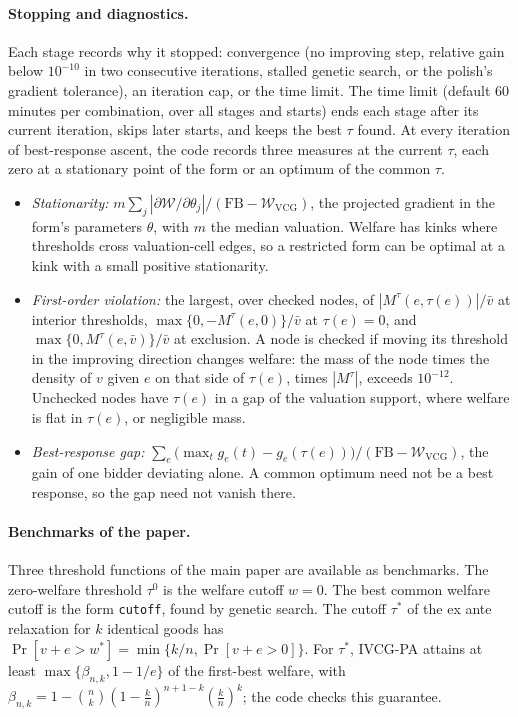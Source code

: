 \documentclass[11pt]{article}
\newcommand{\W}{\mathcal{W}}
\newcommand{\code}[1]{\texttt{#1}}
\begin{document}
\paragraph{Stopping and diagnostics.} Each stage records why it stopped: convergence (no improving step, relative gain below $10^{-10}$ in two consecutive iterations, stalled genetic search, or the polish's gradient tolerance), an iteration cap, or the time limit. The time limit (default 60 minutes per combination, over all stages and starts) ends each stage after its current iteration, skips later starts, and keeps the best $\tau$ found. At every iteration of best-response ascent, the code records three measures at the current $\tau$, each zero at a stationary point of the form or an optimum of the common $\tau$.
\begin{itemize}
    \item \emph{Stationarity:} $m\sum_j|\partial\W/\partial\theta_j|/(\mathrm{FB}-\W_{\mathrm{VCG}})$, the projected gradient in the form's parameters $\theta$, with $m$ the median valuation. Welfare has kinks where thresholds cross valuation-cell edges, so a restricted form can be optimal at a kink with a small positive stationarity.
    \item \emph{First-order violation:} the largest, over checked nodes, of $|M^\tau(e,\tau(e))|/\bar v$ at interior thresholds, $\max\{0,-M^\tau(e,0)\}/\bar v$ at $\tau(e)=0$, and $\max\{0,M^\tau(e,\bar v)\}/\bar v$ at exclusion. A node is checked if moving its threshold in the improving direction changes welfare: the mass of the node times the density of $v$ given $e$ on that side of $\tau(e)$, times $|M^\tau|$, exceeds $10^{-12}$. Unchecked nodes have $\tau(e)$ in a gap of the valuation support, where welfare is flat in $\tau(e)$, or negligible mass.
    \item \emph{Best-response gap:} $\sum_e\bigl(\max_tg_e(t)-g_e(\tau(e))\bigr)/(\mathrm{FB}-\W_{\mathrm{VCG}})$, the gain of one bidder deviating alone. A common optimum need not be a best response, so the gap need not vanish there.
\end{itemize}

\paragraph{Benchmarks of the paper.} Three threshold functions of the main paper are available as benchmarks. The zero-welfare threshold $\tau^0$ is the welfare cutoff $w=0$. The best common welfare cutoff is the form \code{cutoff}, found by genetic search. The cutoff $\tau^*$ of the ex ante relaxation for $k$ identical goods has $\Pr[v+e>w^*]=\min\{k/n,\Pr[v+e>0]\}$. For $\tau^*$, IVCG-PA attains at least $\max\{\beta_{n,k},1-1/e\}$ of the first-best welfare, with $\beta_{n,k}=1-\binom nk(1-\tfrac kn)^{n+1-k}(\tfrac kn)^k$; the code checks this guarantee.
\end{document}
